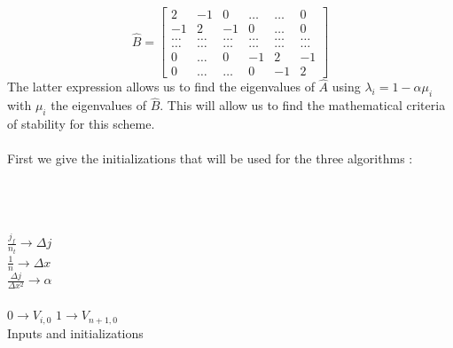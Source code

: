 \documentclass[a4paper, twoside, 11pt]{report}
\theoremstyle{theorem}
\theoremstyle{remark}
\theoremstyle{exemple}
\begin{document}
                    \begin{equation*}
                        \hat{B} =\left[\begin{matrix}
                                     2 & -1 & 0 & \dots & \dots & 0 \\
                                     -1 & 2 & -1 & 0 & \dots & 0 \\
                                     \dots & \dots & \dots & \dots & \dots & \dots\\
                                     \dots & \dots & \dots & \dots & \dots & \dots\\
                                     0 & \dots & 0 & -1 & 2 & -1 \\
                                     0 & \dots & \dots & 0 & -1 & 2
                                  \end{matrix} \right]
                    \end{equation*}
                    The latter expression allows us to find the eigenvalues of $\hat{A}$ using $\lambda_i=1-\alpha \mu_i$ with $\mu_i$ the eigenvalues of $\hat{B}$. This will allow us to find the mathematical criteria of stability for this scheme.

                    \paragraph{}First we give the initializations that will be used for the three algorithms :

                    \begin{center}
                        \begin{algorithm}[H]
                              \\
                              \\
                              \\

                            $\displaystyle \frac{j_f}{n_t} \rightarrow \Delta j$ \\
                            $\displaystyle \frac{1}{n} \rightarrow \Delta x$ \\
                            $\displaystyle \frac{\Delta j}{\Delta x^2} \rightarrow \alpha$ \\

                            \ \\
                            {
                                $0 \rightarrow V_{i,0}$
                            }
                            $1 \rightarrow V_{n+1,0}$  \\
                        \caption{Inputs and initializations}
                        \end{algorithm}
                    \end{center}
\end{document}
